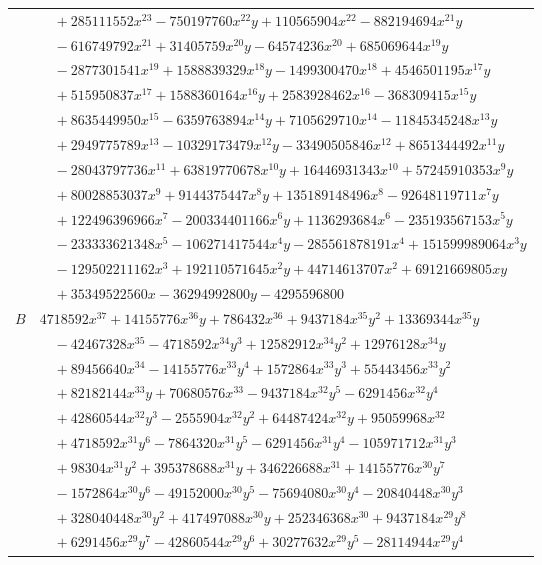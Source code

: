 \documentclass[11pt]{article}
\begin{document}
\begin{longtable}{@{}ll@{}}
 & $\quad +285111552x^{23}-750197760x^{22}y+110565904x^{22}-882194694x^{21}y$\\
 & $\quad -616749792x^{21}+31405759x^{20}y-64574236x^{20}+685069644x^{19}y$\\
 & $\quad -2877301541x^{19}+1588839329x^{18}y-1499300470x^{18}+4546501195x^{17}y$\\
 & $\quad +515950837x^{17}+1588360164x^{16}y+2583928462x^{16}-368309415x^{15}y$\\
 & $\quad +8635449950x^{15}-6359763894x^{14}y+7105629710x^{14}-11845345248x^{13}y$\\
 & $\quad +2949775789x^{13}-10329173479x^{12}y-33490505846x^{12}+8651344492x^{11}y$\\
 & $\quad -28043797736x^{11}+63819770678x^{10}y+16446931343x^{10}+57245910353x^{9}y$\\
 & $\quad +80028853037x^{9}+9144375447x^{8}y+135189148496x^{8}-92648119711x^{7}y$\\
 & $\quad +122496396966x^{7}-200334401166x^{6}y+1136293684x^{6}-235193567153x^{5}y$\\
 & $\quad -233333621348x^{5}-106271417544x^{4}y-285561878191x^{4}+151599989064x^{3}y$\\
 & $\quad -129502211162x^{3}+192110571645x^{2}y+44714613707x^{2}+69121669805xy$\\
 & $\quad +35349522560x-36294992800y-4295596800$\\
$B$ & $4718592x^{37}+14155776x^{36}y+786432x^{36}+9437184x^{35}y^{2}+13369344x^{35}y$\\
 & $\quad -42467328x^{35}-4718592x^{34}y^{3}+12582912x^{34}y^{2}+12976128x^{34}y$\\
 & $\quad +89456640x^{34}-14155776x^{33}y^{4}+1572864x^{33}y^{3}+55443456x^{33}y^{2}$\\
 & $\quad +82182144x^{33}y+70680576x^{33}-9437184x^{32}y^{5}-6291456x^{32}y^{4}$\\
 & $\quad +42860544x^{32}y^{3}-2555904x^{32}y^{2}+64487424x^{32}y+95059968x^{32}$\\
 & $\quad +4718592x^{31}y^{6}-7864320x^{31}y^{5}-6291456x^{31}y^{4}-105971712x^{31}y^{3}$\\
 & $\quad +98304x^{31}y^{2}+395378688x^{31}y+346226688x^{31}+14155776x^{30}y^{7}$\\
 & $\quad -1572864x^{30}y^{6}-49152000x^{30}y^{5}-75694080x^{30}y^{4}-20840448x^{30}y^{3}$\\
 & $\quad +328040448x^{30}y^{2}+417497088x^{30}y+252346368x^{30}+9437184x^{29}y^{8}$\\
 & $\quad +6291456x^{29}y^{7}-42860544x^{29}y^{6}+30277632x^{29}y^{5}-28114944x^{29}y^{4}$\\

\end{longtable}
\end{document}
